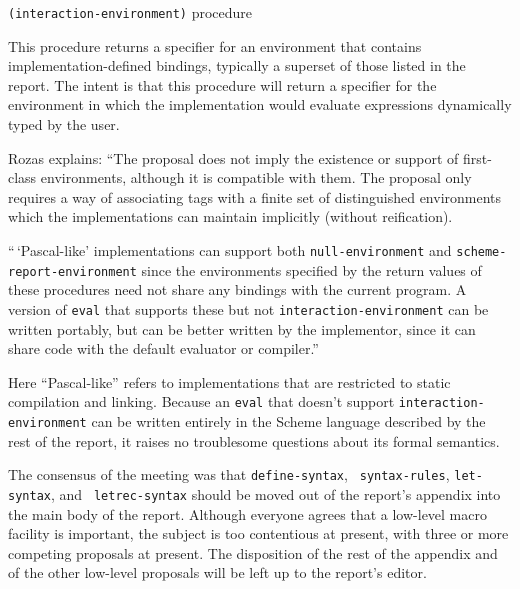 \begin{list}{}{}{}
    \vspace{2ex}

    {\tt(interaction-environment)}
        \hfill {\rm procedure}

    This procedure returns a specifier for an environment that
    contains imple\-men\-ta\-tion-defined bindings, typically a superset of
    those listed in the report.  The intent is that this procedure
    will return a specifier for the environment in which the
    implementation would evaluate expressions dynamically typed by the
    user.

\end{list}

Rozas explains:
``The proposal does not imply the existence or support of first-class
environments, although it is compatible with them.
The proposal only requires a way of associating tags with a finite set
of distinguished environments which the implementations can maintain
implicitly (without reification).

``\,`Pascal-like' implementations can support both {\tt null-environment} and
{\tt scheme-report-environment} since the environments specified by
the return values of these procedures need not share any bindings with
the current program.  A version of {\tt eval} that supports these but
not {\tt interaction-environment} can be written portably,
but can be better written by the implementor, since it can share code
with the default evaluator or compiler.''

Here ``Pascal-like'' refers to implementations that are restricted to
static compilation and linking.  Because an {\tt eval} that doesn't
support
{\tt interaction-\discretionary{}{}{}environment} can be written
entirely in the Scheme language described by the rest of the report,
it raises no troublesome questions about its formal semantics.



The consensus of the meeting was that {\tt define-syntax}, {\tt
syntax-rules}, {\tt let-\discretionary{}{}{}syntax}, and {\tt
letrec-syntax} should be moved out of the report's appendix into the
main body of the report.  Although everyone agrees that a low-level
macro facility is important, the subject is too contentious at
present, with three or more competing proposals at present.  The
disposition of the rest of the appendix and of the other low-level
proposals will be left up to the report's editor.


